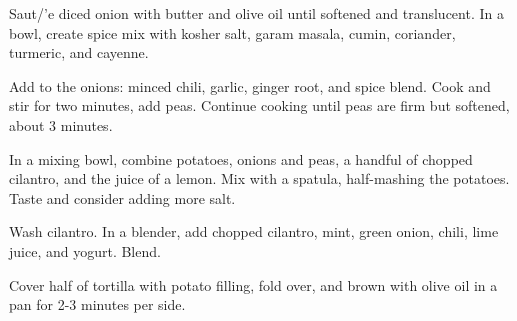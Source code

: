 \begin{recipe}
	Saut/'{e} diced onion with butter and olive oil until softened and translucent. In a bowl, create spice mix with kosher salt, garam masala, cumin, coriander, turmeric, and cayenne.

	Add to the onions: minced chili, garlic, ginger root, and spice blend. Cook and stir for two minutes, add peas. Continue cooking until peas are firm but softened, about 3 minutes.

	In a mixing bowl, combine potatoes, onions and peas, a handful of chopped cilantro, and the juice of a lemon. Mix with a spatula, half-mashing the potatoes. Taste and consider adding more salt.

	 Wash cilantro. In a blender, add chopped cilantro, mint, green onion, chili, lime juice, and yogurt. Blend.

	 Cover half of tortilla with potato filling, fold over, and brown with olive oil in a pan for 2-3 minutes per side.

\end{recipe}
